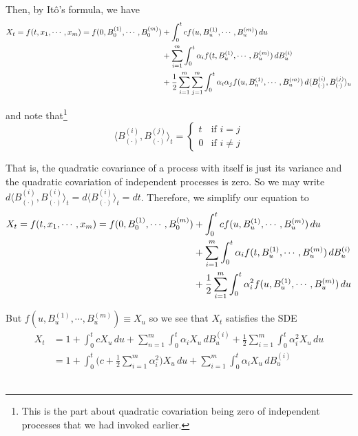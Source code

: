 \documentclass[12pt]{article}
\newlength\tindent
\renewcommand{\indent}{\hspace*{\tindent}}
\begin{document}
Then, by It\^{o}'s formula, we have
\begin{align*}
	X_t = f(t,x_1,\cdots,x_m) &= f(0,B^{(1)}_0,\cdots,B^{(m)}_0) + \int^t_0 cf(u,B^{(1)}_u,\cdots,B^{(m)}_u)\,du \\
	&\hphantom{{}={f(0,B^{(1)}_0,\cdots,B^{(m)}_0)}} + \sum^m_{i=1}\int^t_0 \alpha_if(t,B^{(1)}_u,\cdots,B^{(m)}_u)\,dB^{(i)}_u \\
	&\hphantom{{}={f(0,B^{(1)}_0,\cdots,B^{(m)}_0)}} + \frac{1}{2}\sum^m_{i = 1}\sum^m_{j=1} \int^t_0 \alpha_i\alpha_jf(u,B^{(1)}_u,\cdots,B^{(m)}_u)\,d\langle B^{(i)}_{(\cdot)},B^{(j)}_{(\cdot)}\rangle_u
\end{align*}

and note that\footnote{This is the part about quadratic covariation being zero of independent processes that we had invoked earlier.}
\begin{equation*}
	\langle B^{(i)}_{(\cdot)},B^{(j)}_{(\cdot)}\rangle_t = 
	\begin{cases}
	t & \text{if } i = j \\
	0 & \text{if } i \neq j
	\end{cases}
\end{equation*}

\indent That is, the quadratic covariance of a process with itself is just its variance and the quadratic covariation of independent processes is zero. So we may write $d\langle B^{(i)}_{(\cdot)},B^{(i)}_{(\cdot)}\rangle_t = d\langle B^{(i)}_{(\cdot)}\rangle_t = dt$. Therefore, we simplify our equation to
\begin{align*}
	X_t = f(t,x_1,\cdots,x_m) &= f(0,B^{(1)}_0,\cdots,B^{(m)}_0) + \int^t_0 cf(u,B^{(1)}_u,\cdots,B^{(m)}_u)\,du \\
	&\hphantom{{}={f(0,B^{(1)}_0,\cdots,B^{(m)}_0)}} + \sum^m_{i=1}\int^t_0 \alpha_if(t,B^{(1)}_u,\cdots,B^{(m)}_u)\,dB^{(i)}_u \\
	&\hphantom{{}={f(0,B^{(1)}_0,\cdots,B^{(m)}_0)}} + \frac{1}{2}\sum^m_{i = 1} \int^t_0 \alpha_i^2f(u,B^{(1)}_u,\cdots,B^{(m)}_u)\,du
\end{align*}

But $f(u,B^{(1)}_u,\cdots,B^{(m)}_u) \equiv X_u$ so we see that $X_t$ satisfies the SDE
\begin{align*}
	X_t &= 1 + \int^t_0 cX_u\,du + \sum^m_{n=1}\int^t_0 \alpha_iX_u\,dB^{(i)}_u + \frac{1}{2}\sum^m_{i=1}\int^t_0 \alpha^2_i X_u\,du \\
	&= 1 + \int^t_0 \Big(c + \frac{1}{2}\sum^m_{i=1}\alpha_i^2 \Big)X_u\,du + \sum^m_{i = 1}\int^t_0 \alpha_i X_u\,dB^{(i)}_u
\end{align*}
\\
\end{document}
